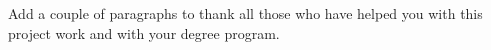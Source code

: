 Add a couple of paragraphs to thank all those who have helped you with this project work and with your degree program.
